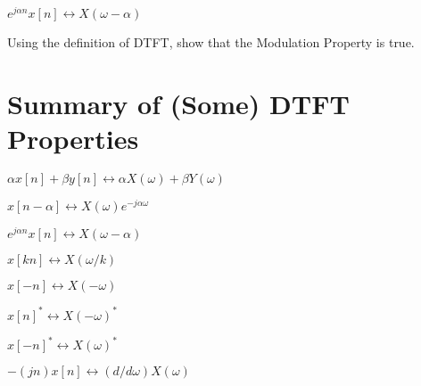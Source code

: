 \documentclass[11pt]{article}
\begin{document}
\begin{center}

$
e^{j \alpha n} x[n]  \longleftrightarrow  X(\omega - \alpha)
$
\end{center}

\vspace{4mm}

Using the definition of DTFT, show that the Modulation Property is true.

\vspace{5mm}

\section{Summary of (Some) DTFT Properties}

\vspace{3mm}


\begin{center}
$
\alpha x[n] + \beta y[n] \longleftrightarrow  \alpha X(\omega) + \beta Y(\omega)
$

\end{center}
\begin{center}
$
x[n - \alpha]  \longleftrightarrow  X(\omega) e^{- j \alpha \omega}
$

\end{center}


\begin{center}

$
e^{j \alpha n} x[n]  \longleftrightarrow  X(\omega - \alpha)
$
\end{center}

\begin{center}

$
x[kn]  \longleftrightarrow  X(\omega / k)
$
\end{center}
\begin{center}

$
x[-n]  \longleftrightarrow  X(-\omega)
$
\end{center}
\begin{center}

$
x[n]^{*} \longleftrightarrow  X(-\omega)^{*}
$
\end{center}
\begin{center}

$
x[-n]^{*} \longleftrightarrow  X(\omega)^{*}
$
\end{center}

\begin{center}

$
-(j n) x[n] \longleftrightarrow (d/d\omega) X(\omega)
$
\end{center}
\end{document}
